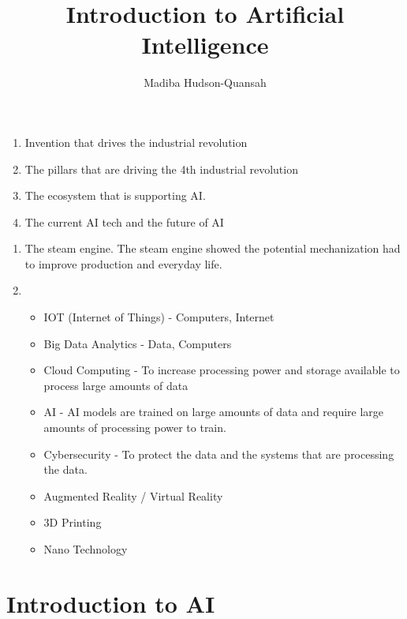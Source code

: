 \documentclass[12pt letter]{report}
\title{\Huge{Introduction to Artificial Intelligence}}
\author{\huge{Madiba Hudson-Quansah}}
\date{}
\begin{document}
\maketitle
\newpage
{}
\tableofcontents
\pagebreak

\begin{enumerate}
  \item Invention that drives the industrial revolution
  \item The pillars that are driving the 4th industrial revolution
  \item The ecosystem that is supporting AI.
  \item The current AI tech and the future of AI
\end{enumerate}



\begin{enumerate}
  \item The steam engine. The steam engine showed the potential mechanization had to improve production and everyday
        life.
  \item
        \begin{itemize}
          \item IOT (Internet of Things) - Computers, Internet
          \item Big Data Analytics - Data, Computers
          \item Cloud Computing - To increase processing power and storage available to process large amounts of data
          \item AI - AI models are trained on large amounts of data and require large amounts of processing power to train.
          \item Cybersecurity - To protect the data and the systems that are processing the data.
          \item Augmented Reality / Virtual Reality
          \item 3D Printing
          \item  Nano Technology
        \end{itemize}
\end{enumerate}

\section{Introduction to AI}
\end{document}

